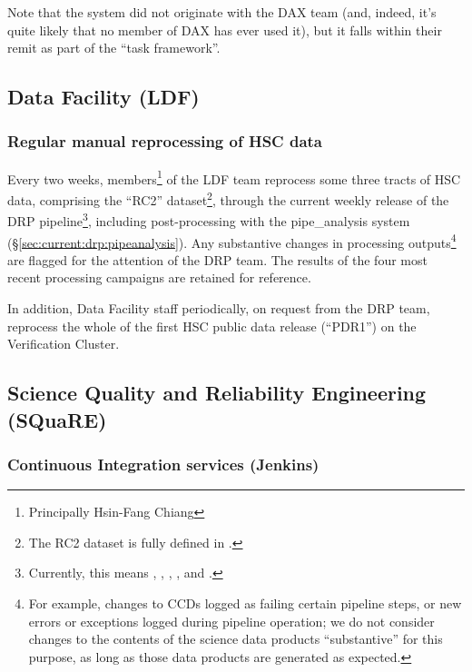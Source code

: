 \documentclass[DM,authoryear,toc,lsstdraft]{lsstdoc}
\begin{document}
Note that the  system did not originate with the DAX team
(and, indeed, it's quite likely that no member of DAX has ever used it), but
it falls within their remit as part of the ``task framework''.

\subsection{Data Facility (LDF)}
\label{sec:current:ldf}

\subsubsection{Regular manual reprocessing of HSC data}
\label{sec:current:ldf:hsc}

Every two weeks, members\footnote{Principally Hsin-Fang Chiang} of the LDF
team reprocess some three tracts of HSC data, comprising the ``RC2''
dataset\footnote{The RC2 dataset is fully defined in .},
through the current weekly release of the DRP pipeline\footnote{Currently,
this means , ,
, ,  and
.}, including post-processing with the pipe\_analysis
system (\S\ref{sec:current:drp:pipeanalysis}). Any substantive changes in
processing outputs\footnote{For example, changes to CCDs logged as failing
certain pipeline steps, or new errors or exceptions logged during pipeline
operation; we do not consider changes to the contents of the science data
products ``substantive'' for this purpose, as long as those data products are
generated as expected.} are flagged for the attention of the DRP team. The
results of the four most recent processing campaigns are retained for
reference.

In addition, Data Facility staff periodically, on request from the DRP team,
reprocess the whole of the first HSC public data release (``PDR1'') on the
Verification Cluster.

\subsection{Science Quality and Reliability Engineering (SQuaRE)}
\label{sec:current:square}

\subsubsection{Continuous Integration services (Jenkins)}
\label{sec:current:square:ci}
\end{document}
